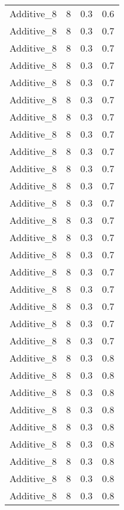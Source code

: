 \documentclass{article}
\begin{document}
\begin{longtable}[H]{lrrr}
 Additive\_8 &       8 &   0.3 &            0.6 \\
 Additive\_8 &       8 &   0.3 &            0.7 \\
 Additive\_8 &       8 &   0.3 &            0.7 \\
 Additive\_8 &       8 &   0.3 &            0.7 \\
 Additive\_8 &       8 &   0.3 &            0.7 \\
 Additive\_8 &       8 &   0.3 &            0.7 \\
 Additive\_8 &       8 &   0.3 &            0.7 \\
 Additive\_8 &       8 &   0.3 &            0.7 \\
 Additive\_8 &       8 &   0.3 &            0.7 \\
 Additive\_8 &       8 &   0.3 &            0.7 \\
 Additive\_8 &       8 &   0.3 &            0.7 \\
 Additive\_8 &       8 &   0.3 &            0.7 \\
 Additive\_8 &       8 &   0.3 &            0.7 \\
 Additive\_8 &       8 &   0.3 &            0.7 \\
 Additive\_8 &       8 &   0.3 &            0.7 \\
 Additive\_8 &       8 &   0.3 &            0.7 \\
 Additive\_8 &       8 &   0.3 &            0.7 \\
 Additive\_8 &       8 &   0.3 &            0.7 \\
 Additive\_8 &       8 &   0.3 &            0.7 \\
 Additive\_8 &       8 &   0.3 &            0.7 \\
 Additive\_8 &       8 &   0.3 &            0.8 \\
 Additive\_8 &       8 &   0.3 &            0.8 \\
 Additive\_8 &       8 &   0.3 &            0.8 \\
 Additive\_8 &       8 &   0.3 &            0.8 \\
 Additive\_8 &       8 &   0.3 &            0.8 \\
 Additive\_8 &       8 &   0.3 &            0.8 \\
 Additive\_8 &       8 &   0.3 &            0.8 \\
 Additive\_8 &       8 &   0.3 &            0.8 \\
 Additive\_8 &       8 &   0.3 &            0.8 \\

\end{longtable}
\end{document}
